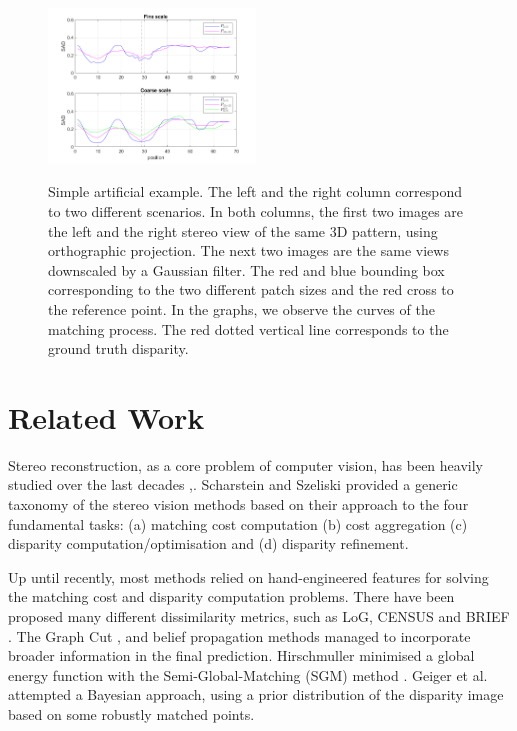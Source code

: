 \documentclass[runningheads]{llncs}
\begin{document}
\begin{figure}[!t]
\begin{center}
        \includegraphics[width=0.49\textwidth]{paper/latex/figures/low_resolution_success_graph.png}\\
        
    \end{center}
    
    \caption{Simple artificial example. The left and the right column correspond to two different scenarios. In both columns, the first two images are the left and the right stereo view of the same 3D pattern, using orthographic projection. The next two images are the same views downscaled by a Gaussian filter. The red and blue bounding box corresponding to the two different patch sizes and the red cross to the reference point. In the graphs, we observe the curves of the matching process. The red dotted vertical line corresponds to the ground truth disparity.}
    \label{fig:multiscale_importance_2D}
\end{figure}


\section{Related Work}

Stereo reconstruction, as a core problem of computer vision, has been heavily studied over the last decades \cite{Barnard1982ComputationalStereo},\cite{Brown2003}. Scharstein and Szeliski \cite{Scharstein2001AAlgorithms} provided a generic taxonomy of the stereo vision methods based on their approach to the four fundamental tasks: (a) matching cost computation (b) cost aggregation (c) disparity computation/optimisation and (d) disparity refinement.

Up until recently, most methods relied on hand-engineered features for solving the matching cost and disparity computation problems. There have been proposed many different dissimilarity metrics, such as LoG, CENSUS \cite{Zabih1996ACorrespondence} and BRIEF \cite{Calonder2010}. The Graph Cut \cite{Kolmogorov}, \cite{Boykov2001} and belief propagation \cite{Klaus2006} methods managed to incorporate broader information in the final prediction. Hirschmuller minimised a global energy function with the Semi-Global-Matching (SGM) method \cite{Hirschmuller2008StereoInformation}. Geiger et al. \cite{Geiger2011EfficientMatching} attempted a Bayesian approach, using a prior distribution of the disparity image based on some robustly matched points.
\end{document}
